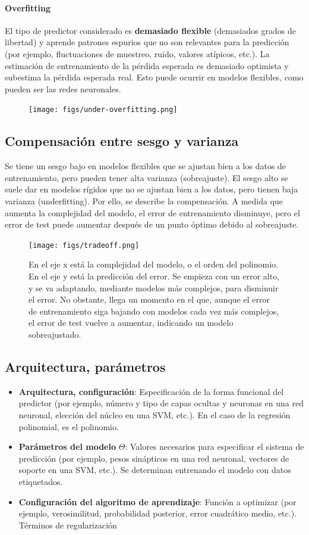 \paragraph{Overfitting}
El tipo de predictor considerado es \textbf{demasiado flexible} (demasiados grados de libertad) y aprende patrones espurios que no son relevantes para la predicción (por ejemplo, fluctuaciones de muestreo, ruido, valores atípicos, etc.). La estimación de entrenamiento de la pérdida esperada es demasiado optimista y subestima la pérdida esperada real. Esto puede ocurrir en modelos flexibles, como pueden ser las redes neuronales.

\begin{figure}[h]
\centering
\texttt{[image: figs/under-overfitting.png]}
\end{figure}

\subsection{Compensación entre sesgo y varianza}
Se tiene un sesgo bajo en modelos flexibles que se ajustan bien a los datos de entrenamiento, pero pueden tener alta varianza (sobreajuste). El sesgo alto se suele dar en modelos rígidos que no se ajustan bien a los datos, pero tienen baja varianza (underfitting). Por ello, se describe la compensación. A medida que aumenta la complejidad del modelo, el error de entrenamiento disminuye, pero el error de test puede aumentar después de un punto óptimo debido al sobreajuste.

\begin{figure}[h]
\centering
\texttt{[image: figs/tradeoff.png]}
\caption{En el eje x está la complejidad del modelo, o el orden del polinomio. En el eje y está la predicción del error. Se empieza con un error alto, y se va adaptando, mediante modelos más complejos, para disminuir el error. No obstante, llega un momento en el que, aunque el error de entrenamiento siga bajando con modelos cada vez más complejos, el error de test vuelve a aumentar, indicando un modelo sobreajustado.}
\end{figure}

\subsection{Arquitectura, parámetros}
\begin{itemize}
\item \textbf{Arquitectura, configuración}: Especificación de la forma funcional del predictor (por ejemplo, número y tipo de capas ocultas y neuronas en una red neuronal, elección del núcleo en una SVM, etc.). En el caso de la regresión polinomial, es el polinomio.
\item \textbf{Parámetros del modelo} $\Theta$: Valores necesarios para especificar el sistema de predicción (por ejemplo, pesos sinápticos en una red neuronal, vectores de soporte en una SVM, etc.). Se determinan entrenando el modelo con datos etiquetados.
\item \textbf{Configuración del algoritmo de aprendizaje}: Función a optimizar (por ejemplo, verosimilitud, probabilidad posterior, error cuadrático medio, etc.). Términos de regularización
\end{itemize}

